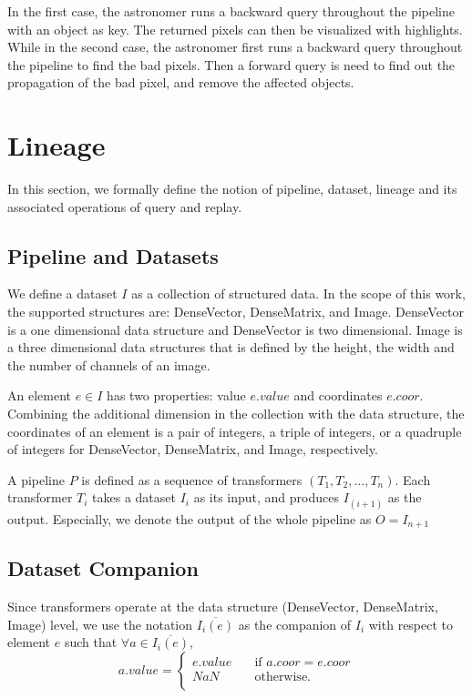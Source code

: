 \documentclass{sig-alternate}
\begin{document}
In the first case, the astronomer runs a backward query throughout the pipeline with an object as key. 
The returned pixels can then be visualized with highlights.
While in the second case, the astronomer first runs a backward query throughout the pipeline to find the bad pixels. 
Then a forward query is need to find out the propagation of the bad pixel, and remove the affected objects.

\section{Lineage}
\label{sec:Lin}
In this section, we formally define the notion of pipeline, dataset, lineage and its associated operations of query and replay.

\subsection{Pipeline and Datasets}
\label{sec:Lin-Pipe-Data}
We define a dataset $I$ as a collection of structured data. In the scope of this work, the supported structures are: 
DenseVector, DenseMatrix, and Image. DenseVector is a one dimensional data structure and DenseVector is
two dimensional. Image is a three dimensional data structures that is defined by the height, the width and the number
of channels of an image. 

An element $e \in I$ has two properties: value $e.value$ and coordinates $e.coor$. 
Combining the additional dimension in the collection with the data structure, 
the coordinates of an element is a pair of integers, a triple of integers, or a quadruple of integers
for DenseVector, DenseMatrix, and Image, respectively.

A pipeline $P$ is defined as a sequence of transformers $(T_1, T_2, ..., T_n)$. 
Each transformer $T_i$ takes a dataset $I_i$ as its input, and produces $I_{(i+1)}$ as the output. 
Especially, we denote the output of the whole pipeline as $O = I_{n+1}$

\subsection{Dataset Companion}
Since transformers operate at the data structure (DenseVector, DenseMatrix, Image) level, we use the notation
$\overline{I_i(e)}$ as the companion of $I_i$ with respect to element $e$ such that $\forall a \in \overline{I_i(e)}$,
\[ a.value =
  \begin{cases}
    e.value       & \quad \text{if } a.coor = e.coor\\
    NaN  & \quad \text{otherwise}. \\
  \end{cases}
\]
\end{document}
